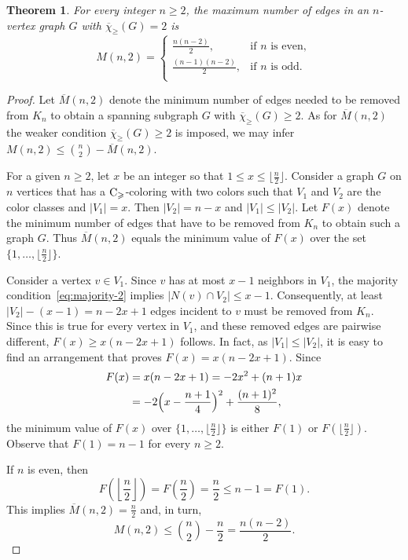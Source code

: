 \documentclass{article}
\newtheorem{theorem}{Theorem}
\theoremstyle{definition}
\newcommand{\mc}{\overline{\chi}_{\geqslant}}
\newcommand{\cg}{{\rm C}_{\geqslant}}
\begin{document}
   \begin{theorem} \label{thm:M(n,2)}
       For every integer $n \ge 2$, the maximum number of edges in an $n$-vertex graph $G$ with $\mc(G) =2$ is 
       $$
    M(n,2)= 
    \begin{cases}
	\frac{n(n-2)}{2}, &\text{if $n$ is even},\\
	\frac{(n-1)(n-2)}{2}, &\text{if $n$ is odd}.\\
    \end{cases}
    $$
   \end{theorem}
   \begin{proof}
   Let $\overline{M}(n,2)$ denote the minimum number of edges needed to be removed from $K_n$ to obtain a spanning subgraph $G$ with $\mc(G) \ge 2$. As for $\overline{M}(n,2)$ the weaker condition $\mc(G) \ge 2$ is imposed, we may infer $M(n,2) \leq  {n \choose 2}- \overline{M}(n,2)$.
   
   For a given $n \ge 2$, let $x$ be an integer so that $1 \leq x \leq \lfloor \frac{n}{2} \rfloor$.   Consider a graph $G$ on $n$ vertices that has a $\cg$-coloring with two colors such that $V_1$ and $V_2$ are the color classes and  $|V_1|=x$. Then $|V_2|=n-x$ and $|V_1| \leq |V_2|$. Let $F(x)$ denote the minimum number of edges that have to be removed from $K_n$ to obtain such a graph $G$. Thus $\overline{M}(n,2)$ equals the minimum value of $F(x)$ over the set $\{1, \dots, \lfloor \frac{n}{2} \rfloor\}$.

   Consider a vertex $v \in V_1$. Since $v$ has at most $x-1$ neighbors in $V_1$, the majority condition~\eqref{eq:majority-2} implies $|N(v) \cap V_2|\leq x-1$. Consequently, at least $|V_2|-(x-1) = n-2x+1$ edges incident to $v$ must be removed from $K_n$. Since this is true for every vertex in $V_1$, and these removed edges are pairwise different, $F(x) \geq x(n-2x+1)$ follows. In fact, as $|V_1| \leq |V_2|$, it is easy to find an arrangement that proves $F(x) = x(n-2x+1)$. %
   Since 
   \begin{align*}
       F(x) &= x(n-2x+1)= -2x^2+(n+1)x\\
            &=-2\Bigl(x-\frac{n+1}{4}\Bigr)^2+ \frac{(n+1)^2}{8},
   \end{align*}
   the minimum value of $F(x)$ over $\{1, \dots, \lfloor \frac{n}{2} \rfloor \}$ is either $F(1)$ or $F(\lfloor \frac{n}{2} \rfloor)$. Observe that $F(1)=n-1$ for every $n \ge 2$.

   If $n$ is even, then
   $$
   F\left(\left\lfloor \frac{n}{2} \right\rfloor \right) = F\left(\frac{n}{2}\right) = \frac{n}{2} \leq n-1 =F(1).
   $$
    This implies $\overline{M}(n,2) = \frac{n}{2}$ and, in turn, 
    \begin{equation} \label{eq:M(n,2)-even}
      M(n,2) \leq  {n \choose 2} - \frac{n}{2} 
     = \frac{n(n-2)}{2}.  
    \end{equation} 
     


\end{proof}
\end{document}
